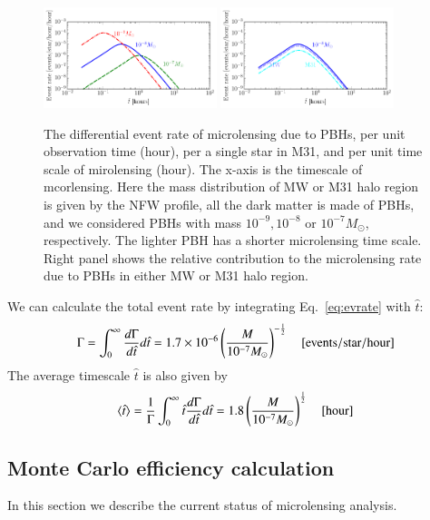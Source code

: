 \documentclass[iop, apj]{emulateapj}
\newcommand{\?}{\stackrel{?}{=}}
\begin{document}
\begin{figure}
\centering
\includegraphics[width=0.45\textwidth]{pic/test_event_rate.pdf}
\includegraphics[width=0.45\textwidth]{pic/test_event_rate_8.pdf}
\caption{\small{
The differential event rate of microlensing due to PBHs, per unit observation time (hour), per a single star in M31, and per unit time scale of mirolensing (hour). The x-axis is the timescale of mcorlensing. Here the mass distribution of MW or M31 halo region is given by the NFW profile, all the dark matter is made of PBHs, and we considered PBHs with mass $10^{-9}, 10^{-8}$ or $10^{-7}M_\odot$, respectively. The lighter PBH has a shorter microlensing time scale. Right panel shows the relative contribution to the microlensing rate due to PBHs in either MW or M31 halo region. }}
\label{fig:m31_eventrate}
\end{figure}
%
We can calculate the total event rate by integrating Eq.~\ref{eq:evrate} with $\hat t$:
%
\begin{eqnarray}
\Gamma=\int^\infty_0\frac{d\Gamma}{d\hat t}d\hat t=1.7\times10^{-6}\left(\frac{M}{10^{-7}M_\odot}\right)^{-\frac{1}{2}} \quad{\rm [events/star/hour]}%
\end{eqnarray}
%
The average timescale $\hat t$ is also given by 
%
\begin{eqnarray}
\langle \hat t \rangle=\frac{1}{\Gamma}\int^\infty_0\hat t\frac{d\Gamma}{d\hat t}d\hat t=1.8\left(\frac{M}{10^{-7}M_\odot}\right)^{\frac{1}{2}}\quad [{\rm hour}]
\end{eqnarray}



\subsection{Monte Carlo efficiency calculation}
In this section we describe the current status of microlensing analysis. 
\end{document}
